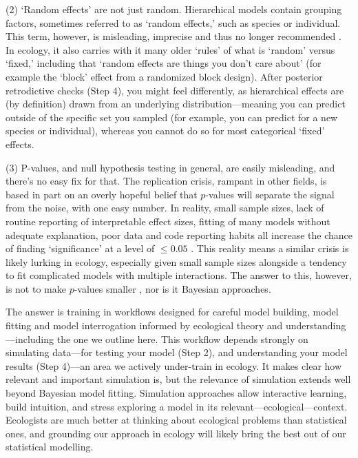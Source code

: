 \documentclass[11pt]{article}
\begin{document}
(2) `Random effects' are not just random. Hierarchical models contain grouping factors, sometimes referred to as `random effects,' such as species or individual. This term, however, is misleading, imprecise and thus no longer recommended \citep{gelmanhill}. In ecology, it also carries with it many older `rules' of what is `random' versus `fixed,' including that `random effects are things you don't care about' (for example the `block' effect from a randomized block design). After posterior retrodictive checks (Step 4), you might feel differently, as hierarchical effects are (by definition) drawn from an underlying distribution---meaning you can predict outside of the specific set you sampled (for example, you can predict for a new species or individual), whereas you cannot do so for most categorical `fixed' effects.


(3) P-values, and null hypothesis testing in general, are easily misleading, and there’s no easy fix for that. The replication crisis, rampant in other fields, is based in part on an overly hopeful belief that $p$-values will separate the signal from the noise, with one easy number. In reality, small sample sizes, lack of routine reporting of interpretable effect sizes, fitting of many models without adequate explanation, poor data and code reporting habits all increase the chance of finding `significance' at a level of $\le0.05$ \citep{halsey2015,loken2017}. This reality means a similar crisis is likely lurking in ecology, especially given small sample sizes alongside a tendency to fit complicated models with multiple interactions. The answer to this, however, is not to make $p$-values smaller \citep{halsey2015,colquhoun2017}, nor is it Bayesian approaches. %

The answer is training in workflows designed for careful model building, model fitting and model interrogation informed by ecological theory and understanding---including the one we outline here. This workflow depends strongly on simulating data---for testing your model (Step 2), and understanding your model results (Step 4)---an area we actively under-train in ecology. It makes clear how relevant and important simulation is, but the relevance of simulation extends well beyond Bayesian model fitting. Simulation approaches allow interactive learning, build intuition, and stress exploring a model in its relevant---ecological---context. Ecologists are much better at thinking about ecological problems than statistical ones, and grounding our approach in ecology will likely bring the best out of our statistical modelling.
\end{document}
